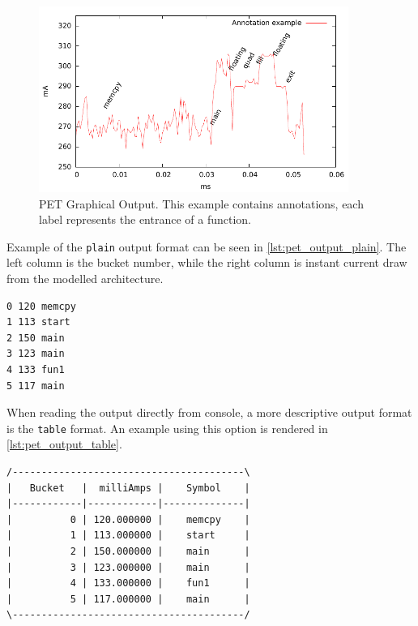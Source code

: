 \begin{figure}[htb]
    \centering
    \includegraphics[width=0.9\textwidth]{figs/annot.pdf}
    \caption{PET Graphical Output. This example contains annotations, each label
    represents the entrance of a function.}
    \label{fig:annot}
\end{figure}

Example of the \texttt{plain} output format can be seen in
\autoref{lst:pet_output_plain}. The left column is the bucket number, while the
right column is instant current draw from the modelled architecture.

\begin{lstlisting}[numbers=none,float=hbt,label={lst:pet_output_plain},caption={PET plain output with function annotations.}]
0 120 memcpy
1 113 start
2 150 main
3 123 main
4 133 fun1
5 117 main
\end{lstlisting}

When reading the output directly from console, a more descriptive output format
is the \texttt{table} format. An example using this option is rendered in
\autoref{lst:pet_output_table}.

\begin{lstlisting}[numbers=none,float=hbt,label={lst:pet_output_table},caption={PET table output with function annotations.}]
/----------------------------------------\
|   Bucket   |  milliAmps |    Symbol    |
|------------|------------|--------------|
|          0 | 120.000000 |    memcpy    |
|          1 | 113.000000 |    start     |
|          2 | 150.000000 |    main      |
|          3 | 123.000000 |    main      |
|          4 | 133.000000 |    fun1      |
|          5 | 117.000000 |    main      |
\----------------------------------------/
\end{lstlisting}


